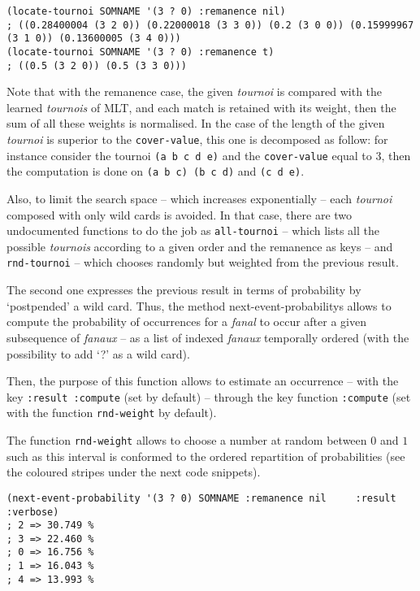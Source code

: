\bigskip
\begin{lstlisting}[language=N3]
(locate-tournoi SOMNAME '(3 ? 0) :remanence nil)
; ((0.28400004 (3 2 0)) (0.22000018 (3 3 0)) (0.2 (3 0 0)) (0.15999967 (3 1 0)) (0.13600005 (3 4 0)))
(locate-tournoi SOMNAME '(3 ? 0) :remanence t)
; ((0.5 (3 2 0)) (0.5 (3 3 0)))
\end{lstlisting}
\bigskip

Note that with the remanence case, the given \textit{tournoi} is compared with the learned \textit{tournois} of MLT, and each match is retained with its weight, then the sum of all these weights is normalised. In the case of the length of the given \textit{tournoi} is superior to the \texttt{cover-value}, this one is decomposed as follow: for instance consider the tournoi \texttt{(a b c d e)} and the \texttt{cover-value} equal to 3, then the computation is done on \texttt{(a b c) (b c d)} and  \texttt{(c d e)}.

\smallskip

Also, to limit the search space -- which increases exponentially -- each \textit{tournoi} composed with only wild cards is avoided. In that case, there are two undocumented functions to do the job as \texttt{all-tournoi} -- which lists all the possible \textit{tournois} according to a given order and the remanence as keys -- and \texttt{rnd-tournoi} -- which chooses randomly but weighted from the previous result.

\bigskip

The second one expresses the previous result in terms of probability by `postpended' a wild card. 
Thus, the method \glspl{next-event-probability} allows to compute the probability of occurrences for a \textit{fanal} to occur after a given subsequence of \textit{fanaux} -- as a list of indexed \textit{fanaux} temporally ordered (with the possibility to add `?' as a wild card).

\smallskip

Then, the purpose of this function allows to estimate an occurrence -- with the key \texttt{:result :compute} (set by default) -- through the key function \texttt{:compute} (set with the function \texttt{rnd-weight} by default). 

The function \texttt{rnd-weight} allows to choose a number at random between $0$ and $1$ such as this interval is conformed to the ordered repartition of probabilities (see the coloured stripes under the next code snippets).

\bigskip

\begin{lstlisting}[language=N3]
(next-event-probability '(3 ? 0) SOMNAME :remanence nil     :result :verbose) 
; 2 => 30.749 %
; 3 => 22.460 %
; 0 => 16.756 %
; 1 => 16.043 %
; 4 => 13.993 %
\end{lstlisting}

